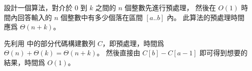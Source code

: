 \startEXERCISE
設計一個算法，對介於 $0$ 到 $k$ 之間的 $n$ 個整數先進行預處理，
然後在 $O(1)$ 時間內回答輸入的 $n$ 個整數中有多少個落在區間 $[a..b]$ 內。
此算法的預處理時間應爲 $\Theta(n+k)$。
\stopEXERCISE

\startANSWER
先利用  中的部分代碼構建數列 $C$，即預處理，時間爲 $\Theta(n) + \Theta(k) = \Theta(n+k)$。
然後直接由 $C[b] - C[a-1]$ 即可得到想要的結果，時間爲 $O(1)$。
\stopANSWER
